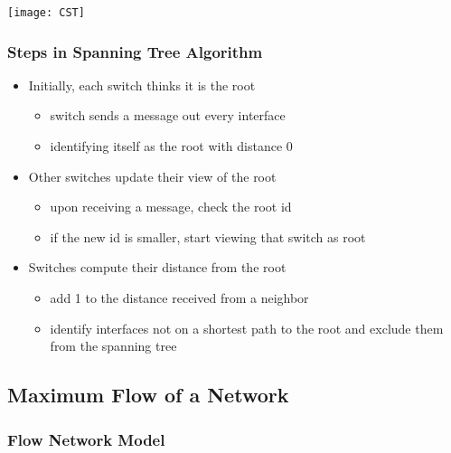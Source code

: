 \documentclass[../resumosRCOM.tex]{subfiles}
\begin{document}
\begin{center}
    \texttt{[image: CST]}
\end{center}

\subsubsection{Steps in Spanning Tree Algorithm}

\begin{itemize}
    \item Initially, each switch thinks it is the root
    \begin{itemize}
        \item switch sends a message out every interface
        \item identifying itself as the root with distance 0
    \end{itemize}
    \item Other switches update their view of the root
    \begin{itemize}
        \item upon receiving a message, check the root id
        \item if the new id is smaller, start viewing that switch as root
    \end{itemize}
    \item Switches compute their distance from the root
    \begin{itemize}
        \item add 1 to the distance received from a neighbor
        \item identify interfaces not on a shortest path to the root and exclude them from the spanning tree
    \end{itemize}
\end{itemize}

\subsection{Maximum Flow of a Network}

\subsubsection{Flow Network Model}
\end{document}
